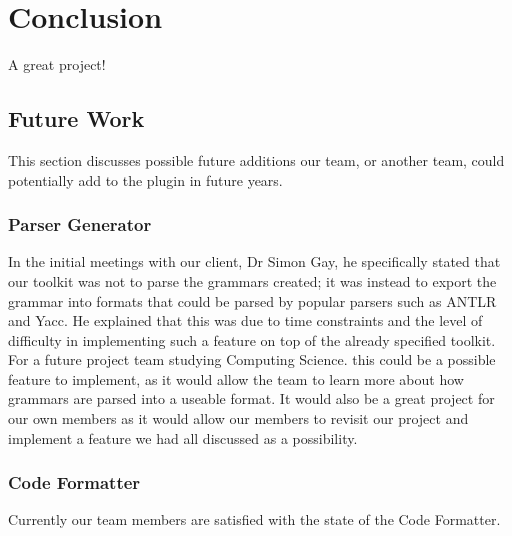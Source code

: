 \chapter{Conclusion}
\label{conclusion}

A great project!

\section{Future Work}
This section discusses possible future additions our team, or another team, could potentially add to the plugin in future years. 

\subsection{Parser Generator}
In the initial meetings with our client, Dr Simon Gay, he specifically stated that our toolkit was not to parse the grammars created; it was instead to export the grammar into formats that could be parsed by popular parsers such as ANTLR and Yacc. He explained that this was due to time constraints and the level of difficulty in implementing such a feature on top of the already specified toolkit. For a future project team studying Computing Science. this could be a possible feature to implement, as it would allow the team to learn more about how grammars are parsed into a useable format. It would also be a great project for our own members as it would allow our members to revisit our project and implement a feature we had all discussed as a possibility. 

\subsection{Code Formatter}
Currently our team members are satisfied with the state of the Code Formatter. 
